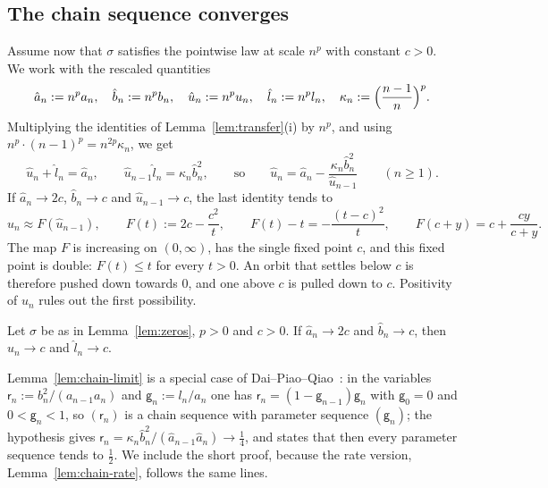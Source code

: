 \subsection{The chain sequence converges}

Assume now that $\sigma$ satisfies the pointwise law at scale $n^p$ with constant $c>0$. We work with the rescaled
quantities
\[
  \hat a_n:=n^pa_n,\quad \hat b_n:=n^pb_n,\quad \hat u_n:=n^pu_n,\quad \hat l_n:=n^pl_n,\quad
  \kappa_n:=\Bigl(\frac{n-1}n\Bigr)^p .
\]
Multiplying the identities of Lemma~\ref{lem:transfer}(i) by $n^p$, and using $n^p\cdot(n-1)^p=n^{2p}\kappa_n$, we get
\begin{equation}\label{eq:scaled-chain}
  \hat u_n+\hat l_n=\hat a_n,\qquad \hat u_{n-1}\hat l_n=\kappa_n\hat b_n^2,\qquad\text{so}\qquad
  \hat u_n=\hat a_n-\frac{\kappa_n\hat b_n^2}{\hat u_{n-1}}\qquad(n\ge1).
\end{equation}
If $\hat a_n\to2c$, $\hat b_n\to c$ and $\hat u_{n-1}\to c$, the last identity tends to
\begin{equation}\label{eq:chain-map}
  \hat u_n\approx F(\hat u_{n-1}),\qquad F(t):=2c-\frac{c^2}t,\qquad
  F(t)-t=-\frac{(t-c)^2}t,\qquad F(c+y)=c+\frac{cy}{c+y}.
\end{equation}
The map $F$ is increasing on $(0,\infty)$, has the single fixed point $c$, and this fixed point is double: $F(t)\le t$
for every $t>0$. An orbit that settles below $c$ is therefore pushed down towards $0$, and one above $c$ is pulled down
to $c$. Positivity of $u_n$ rules out the first possibility.

\begin{lemma}\label{lem:chain-limit}
Let $\sigma$ be as in Lemma~\ref{lem:zeros}, $p>0$ and $c>0$. If $\hat a_n\to2c$ and $\hat b_n\to c$, then
$\hat u_n\to c$ and $\hat l_n\to c$.
\end{lemma}

Lemma~\ref{lem:chain-limit} is a special case of Dai--Piao--Qiao~\cite[Proposition~2.1]{DPQ}: in the variables
$\mathsf r_n:=b_n^2/(a_{n-1}a_n)$ and $\mathsf g_n:=l_n/a_n$ one has $\mathsf r_n=(1-\mathsf g_{n-1})\mathsf g_n$ with
$\mathsf g_0=0$ and $0<\mathsf g_n<1$, so $(\mathsf r_n)$ is a chain sequence with parameter sequence $(\mathsf g_n)$; the
hypothesis gives $\mathsf r_n=\kappa_n\hat b_n^2/(\hat a_{n-1}\hat a_n)\to\frac14$, and
\cite[Proposition~2.1]{DPQ} states that then every parameter sequence tends to $\frac12$. We include the short proof,
because the rate version, Lemma~\ref{lem:chain-rate}, follows the same lines.

